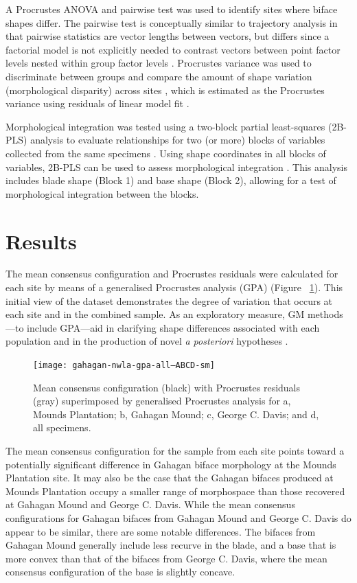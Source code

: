 \documentclass[review]{elsarticle}
\begin{document}
A Procrustes ANOVA and pairwise test was used to identify sites where biface shapes differ. The pairwise test is conceptually similar to trajectory analysis \citep{RN11573,RN1648,RN1776,RN1739} in that pairwise statistics are vector lengths between vectors, but differs since a factorial model is not explicitly needed to contrast vectors between point factor levels nested within group factor levels \citep{RN11530}. Procrustes variance was used to discriminate between groups and compare the amount of shape variation (morphological disparity) across sites \citep{RN11560}, which  is estimated as the Procrustes variance using residuals of linear model fit \citep{RN11530}. 

Morphological integration was tested using a two-block partial least-squares (2B-PLS) analysis to evaluate relationships for two (or more) blocks of variables collected from the same specimens \citep{RN11615,RN11613,RN11614}. Using shape coordinates in all blocks of variables, 2B-PLS can be used to assess morphological integration \citep{RN11616,RN11615,RN11617}. This analysis includes blade shape (Block 1) and base shape (Block 2), allowing for a test of morphological integration between the blocks.

\section{Results}

The mean consensus configuration and Procrustes residuals were calculated for each site by means of a generalised Procrustes analysis (GPA) \citep[Figure 3]{RN1720} (Figure ~\ref{fig:FigGPA}). This initial view of the dataset demonstrates the degree of variation that occurs at each site and in the combined sample. As an exploratory measure, GM methods---to include GPA---aid in clarifying shape differences associated with each population and in the production of novel \textit{a posteriori} hypotheses \citep{RN1720}.  

\begin{figure}[ht]\centering
\texttt{[image: gahagan-nwla-gpa-all--ABCD-sm]}
\caption{Mean consensus configuration (black) with Procrustes residuals (gray) superimposed by generalised Procrustes analysis for a, Mounds Plantation; b, Gahagan Mound; c, George C. Davis; and d, all specimens.}
\label{fig:FigGPA}
\end{figure}

The mean consensus configuration for the sample from each site points toward a potentially significant difference in Gahagan biface morphology at the Mounds Plantation site. It may also be the case that the Gahagan bifaces produced at Mounds Plantation occupy a smaller range of morphospace than those recovered at Gahagan Mound and George C. Davis. While the mean consensus configurations for Gahagan bifaces from Gahagan Mound and George C. Davis do appear to be similar, there are some notable differences. The bifaces from Gahagan Mound generally include less recurve in the blade, and a base that is more convex than that of the bifaces from George C. Davis, where the mean consensus configuration of the base is slightly concave.
\end{document}
